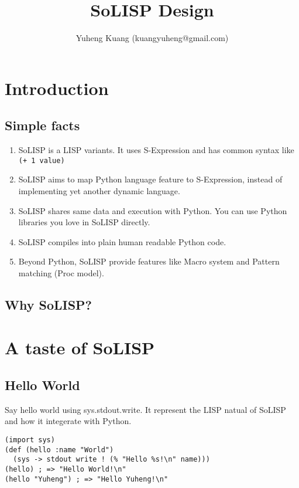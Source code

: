 \documentclass[a4paper,11pt]{article}
\title{SoLISP Design}
\author{Yuheng Kuang (kuangyuheng@gmail.com)}
\begin{document}
\maketitle

\section{Introduction}

\subsection{Simple facts}

\begin{enumerate}
\item SoLISP is a LISP variants. It uses S-Expression and has common syntax like \verb|(+ 1 value)|
\item SoLISP aims to map Python language feature to S-Expression, instead of implementing yet another dynamic language.
\item SoLISP shares same data and execution with Python. You can use Python libraries you love in SoLISP directly.
\item SoLISP compiles into plain human readable Python code.
\item Beyond Python, SoLISP provide features like Macro system and Pattern matching (Proc model).
\end{enumerate}

\subsection{Why SoLISP?}

\section{A taste of SoLISP}

\subsection{Hello World}

Say hello world using sys.stdout.write. It represent the LISP natual of SoLISP and how it integerate with Python.

\begin{verbatim}
(import sys)
(def (hello :name "World")
  (sys -> stdout write ! (% "Hello %s!\n" name)))
(hello) ; => "Hello World!\n"
(hello "Yuheng") ; => "Hello Yuheng!\n"
\end{verbatim}
\end{document}
